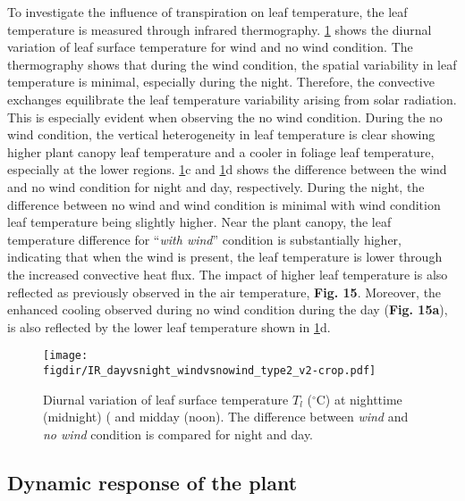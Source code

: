 To investigate the influence of transpiration on leaf temperature, the leaf temperature is measured through infrared thermography. \cref{fig:IR_dayvsnight_windvsnowind_type2_v2} shows the diurnal variation of leaf surface temperature for wind and no wind condition. The thermography shows that during the wind condition, the spatial variability in leaf temperature is minimal, especially during the night. Therefore, the convective exchanges equilibrate the leaf temperature variability arising from solar radiation. This is especially evident when observing the no wind condition. During the no wind condition, the vertical heterogeneity in leaf temperature is clear showing higher plant canopy leaf temperature and a cooler in foliage leaf temperature, especially at the lower regions. \cref{fig:IR_dayvsnight_windvsnowind_type2_v2}c and \cref{fig:IR_dayvsnight_windvsnowind_type2_v2}d shows the difference between the wind and no wind condition for night and day, respectively. During the night, the difference between no wind and wind condition is minimal with wind condition leaf temperature being slightly higher. Near the plant canopy, the leaf temperature difference for ``\textit{with wind}'' condition is substantially higher, indicating that when the wind is present, the leaf temperature is lower through the increased convective heat flux. The impact of higher leaf temperature is also reflected as previously observed in the air temperature,\textbf{ Fig. 15}. Moreover, the enhanced cooling observed during no wind condition during the day (\textbf{Fig. 15a}), is also reflected by the lower leaf temperature shown in \cref{fig:IR_dayvsnight_windvsnowind_type2_v2}d.

	\begin{figure}[t]
	\centering
	\texttt{[image: \\figdir/IR\_dayvsnight\_windvsnowind\_type2\_v2-crop.pdf]}
	\caption{Diurnal variation of leaf surface temperature $T_l$ ($^{\circ}$C) at  nighttime (midnight) (  and midday (noon). The difference between \textit{wind} and \textit{no wind} condition is compared for  night and  day.}
	\label{fig:IR_dayvsnight_windvsnowind_type2_v2}
	\end{figure}


\subsection{Dynamic response of the plant}
\label{subsec:dynamic}


